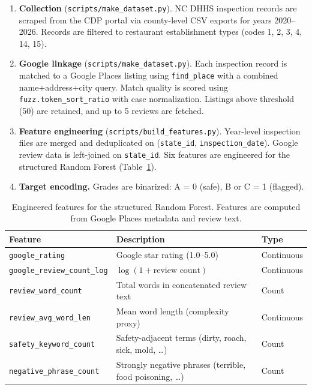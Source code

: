 \documentclass{article}
\begin{document}
\begin{enumerate}
    \item \textbf{Collection} (\texttt{scripts/make\_dataset.py}). NC DHHS inspection records are scraped from the CDP portal via county-level CSV exports for years 2020--2026. Records are filtered to restaurant establishment types (codes 1, 2, 3, 4, 14, 15).

    \item \textbf{Google linkage} (\texttt{scripts/make\_dataset.py}). Each inspection record is matched to a Google Places listing using \texttt{find\_place} with a combined name+address+city query. Match quality is scored using \texttt{fuzz.token\_sort\_ratio} with case normalization. Listings above threshold (50) are retained, and up to 5 reviews are fetched.

    \item \textbf{Feature engineering} (\texttt{scripts/build\_features.py}). Year-level inspection files are merged and deduplicated on (\texttt{state\_id}, \texttt{inspection\_date}). Google review data is left-joined on \texttt{state\_id}. Six features are engineered for the structured Random Forest (Table~\ref{tab:features}).

    \item \textbf{Target encoding.} Grades are binarized: A = 0 (safe), B or C = 1 (flagged).
\end{enumerate}

\begin{table}[h]
\centering
\caption{Engineered features for the structured Random Forest. Features are computed from Google Places metadata and review text.}
\label{tab:features}
\begin{tabular}{lll}
\toprule
\textbf{Feature} & \textbf{Description} & \textbf{Type} \\
\midrule
\texttt{google\_rating} & Google star rating (1.0--5.0) & Continuous \\
\texttt{google\_review\_count\_log} & $\log(1 + \text{review count})$ & Continuous \\
\texttt{review\_word\_count} & Total words in concatenated review text & Count \\
\texttt{review\_avg\_word\_len} & Mean word length (complexity proxy) & Continuous \\
\texttt{safety\_keyword\_count} & Safety-adjacent terms (dirty, roach, sick, mold, \ldots) & Count \\
\texttt{negative\_phrase\_count} & Strongly negative phrases (terrible, food poisoning, \ldots) & Count \\
\bottomrule
\end{tabular}
\end{table}
\end{document}
